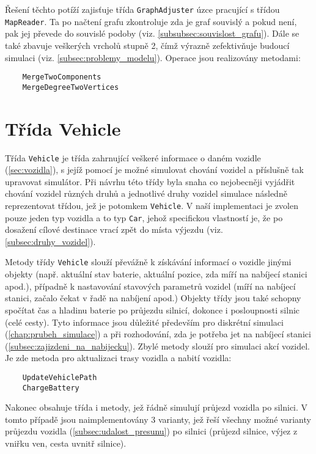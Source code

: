 Řešení těchto potíží zajisťuje třída \texttt{GraphAdjuster} úzce pracující s
třídou \texttt{MapReader}. Ta po načtení grafu zkontroluje zda je graf souvislý
a pokud není, pak jej převede do souvislé podoby 
(viz. \cref{subsubsec:souvislost_grafu}). Dále se také zbavuje veškerých vrcholů 
stupně 2, čímž výrazně zefektivňuje budoucí simulaci (viz. \cref{subsec:problemy_modelu}). 
Operace jsou realizovány metodami:

\begin{verbatim}
    MergeTwoComponents
    MergeDegreeTwoVertices
\end{verbatim}


\section{Třída Vehicle}

Třída \texttt{Vehicle} je třída zahrnující veškeré informace o daném vozidle (\cref{sec:vozidla}),
s jejíž pomocí je možné simulovat chování vozidel a příslušně tak upravovat simulátor.
Při návrhu této třídy byla snaha co nejobecněji vyjádřit chování vozidel 
různých druhů a jednotlivé druhy vozidel simulace následně reprezentovat třídou,
jež je potomkem \texttt{Vehicle}. V naší implementaci je zvolen pouze jeden typ vozidla a 
to typ \texttt{Car}, jehož specifickou vlastností je, že po dosažení cílové 
destinace vrací zpět do místa výjezdu (viz. \cref{subsec:druhy_vozidel}).

Metody třídy \texttt{Vehicle} slouží převážně k získávání informací o vozidle
jinými objekty (např. aktuální stav baterie, aktuální pozice, 
zda míří na nabíjecí stanici apod.), případně k nastavování stavových parametrů 
vozidel (míří na nabíjecí stanici, začalo čekat v řadě na nabíjení apod.)
Objekty třídy jsou také schopny spočítat čas a hladinu baterie po průjezdu
silnicí, dokonce i posloupnosti silnic (celé cesty). Tyto informace jsou důležité
především pro diskrétní simulaci (\cref{chap:prubeh_simulace}) a při rozhodování, 
zda je potřeba jet na nabíjecí stanici (\cref{subsec:zajizdeni_na_nabijecku}).
Zbylé metody slouží pro simulaci akcí vozidel. Je zde metoda pro aktualizaci
trasy vozidla a nabití vozidla:

\begin{verbatim}
    UpdateVehiclePath
    ChargeBattery
\end{verbatim}

Nakonec obsahuje třída i metody, jež řádně simulují průjezd vozidla po silnici. 
V tomto případě jsou naimplementovány 3 varianty, jež řeší všechny možné varianty
průjezdu vozidla (\cref{subsec:udalost_presunu}) po silnici 
(průjezd silnice, výjez z vniřku ven, cesta uvnitř silnice).


